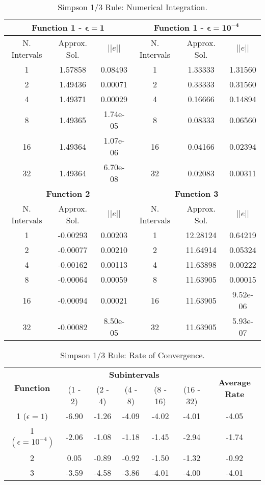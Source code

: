 \begin{table}[H]
    \centering
    \caption{Simpson 1/3 Rule: Numerical Integration.}
    \label{tab:simpson13_int}
    \begin{tabular}{ccc|ccc}
    \hline
    \multicolumn{3}{c}{\textbf{Function 1  -} $\bm{\epsilon = 1}$} & \multicolumn{3}{c}{\textbf{Function 1 -} $\bm{\epsilon = 10^{-4}}$} \\ \hline
    N. Intervals & Approx. Sol. & $|| e ||$ & N. Intervals & Approx. Sol. & $|| e ||$ \\ \hline
    1 & 1.57858 & 0.08493 & 1 & 1.33333& 1.31560 \\
    2 & 1.49436 & 0.00071 & 2 & 0.33333 & 0.31560 \\
    4 & 1.49371 & 0.00029 & 4 & 0.16666 & 0.14894 \\
    8 & 1.49365 & 1.74e-05 & 8 & 0.08333 & 0.06560 \\
    16 & 1.49364 & 1.07e-06 & 16 & 0.04166 & 0.02394 \\
    32 & 1.49364 & 6.70e-08 & 32 & 0.02083 & 0.00311 \\ \hline
    \multicolumn{3}{c}{\textbf{Function 2}} & \multicolumn{3}{c}{\bf{Function 3}} \\ \hline
    N. Intervals & Approx. Sol. & $|| e ||$ & N. Intervals & Approx. Sol. & $|| e ||$ \\ \hline
    1 & -0.00293  & 0.00203  & 1 & 12.28124 &  0.64219 \\
    2 & -0.00077  & 0.00210  & 2 & 11.64914 &  0.05324 \\
    4 & -0.00162  & 0.00113  & 4 & 11.63898  & 0.00222 \\
    8 & -0.00064 & 0.00059  & 8 &  11.63905 &  0.00015 \\
    16 & -0.00094 & 0.00021 & 16 & 11.63905 &  9.52e-06 \\
    32 & -0.00082 & 8.50e-05  & 32 & 11.63905  & 5.93e-07  \\ \hline
    \end{tabular}
\end{table}
\begin{table}[H]
    \centering
    \caption{Simpson 1/3 Rule: Rate of Convergence.}
    \label{tab:simpson13_rate}
    \begin{tabular}{ccccccc}
        \hline
        \multirow{2}{*}{\textbf{Function}} & \multicolumn{5}{c}{\textbf{Subintervals}} & \multicolumn{1}{c}{\multirow{2}{*}{\textbf{Average Rate}}} \\ \cline{2-6}
 & (1 - 2) & (2 - 4) & (4 - 8) & (8 - 16) & (16 - 32) & \multicolumn{1}{c}{} \\ \hline
        \makecell{1 \\ ($\epsilon = 1$)} & -6.90 & -1.26 & -4.09 & -4.02 & -4.01 & -4.05 \\
        \makecell{1 \\ $\left(\epsilon = 10^{-4}\right)$} & -2.06 & -1.08 & -1.18 & -1.45 & -2.94 & -1.74 \\
        2 & 0.05 & -0.89 & -0.92 & -1.50 & -1.32 & -0.92 \\ 
        3 & -3.59 & -4.58 & -3.86 & -4.01 & -4.00 & -4.01 \\ \hline
    \end{tabular}
\end{table}

